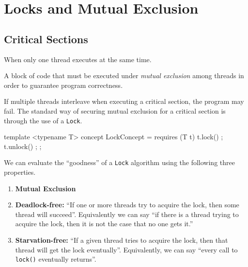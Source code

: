 \chapter{Locks and Mutual Exclusion}\label{chp:discrete_math}
\minitoc

\section{Critical Sections}
\begin{definition}\label{def:mutual_exclusion}
    When only one thread executes at the same time.
\end{definition}

\begin{definition}\label{def:critical_section}
    A block of code that must be executed under \textit{mutual exclusion} among threads in order to guarantee program correctness.
\end{definition}

If multiple threads interleave when executing a critical section, the program may fail. The standard way of securing mutual exclusion for a critical section is through the use of a \verb'Lock'.
\bigskip

\begin{verbbox}
    template <typename T>
    concept LockConcept = requires (T t)
    {
        { t.lock() };
        { t.unlock() };
    };
\end{verbbox}

{\centering
\fbox{\theverbbox}
}

We can evaluate the ``goodness'' of a \verb|Lock| algorithm using the following three properties.
\begin{enumerate}
    \item \textbf{Mutual Exclusion}
    \item \textbf{Deadlock-free:} ``If one or more threads try to acquire the lock, then some thread will succeed''. Equivalently we can say ``if there is a thread trying to acquire the lock, then it is not the case that no one gets it.''
    \item \textbf{Starvation-free:} ``If a given thread tries to acquire the lock, then that thread will get the lock eventually''. Equivalently, we can say ``every call to \verb|lock()| eventually returns''.
\end{enumerate}

